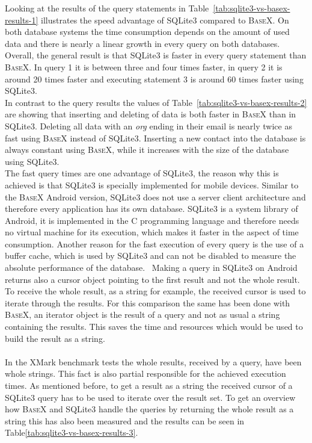 Looking at the results of the query statements in Table~\ref{tab:sqlite3-vs-basex-results-1} illustrates the speed advantage of SQLite3 compared to \textsc{BaseX}.
On both database systems the time consumption depends on the amount of used data and there is nearly a linear growth in every query on both databases.
Overall, the general result is that SQLite3 is faster in every query statement than \textsc{BaseX}.
In query 1 it is between three and four times faster, in query 2 it is around 20 times faster and executing statement 3 is around 60 times faster using SQLite3.\\
In contrast to the query results the values of Table~\ref{tab:sqlite3-vs-basex-results-2} are showing that inserting and deleting of data is both faster in \textsc{BaseX} than in SQLite3.
Deleting all data with an \textit{org} ending in their email is nearly twice as fast using \textsc{BaseX} instead of SQLite3.
Inserting a new contact into the database is always constant using \textsc{BaseX}, while it increases with the size of the database using SQLite3.\\
The fast query times are one advantage of SQLite3, the reason why this is achieved is that SQLite3 is specially implemented for mobile devices.
Similar to the \textsc{BaseX} Android version, SQLite3 does not use a server client architecture and therefore every application has its own database.\cite{wei2012android}
SQLite3 is a system library of Android, it is implemented in the C programming language and therefore needs no virtual machine for its execution, which makes it faster in the aspect of time consumption.
Another reason for the fast execution of every query is the use of a buffer cache, which is used by SQLite3 and can not be disabled to measure the absolute performance of the database.~\cite{kim2012androbench}
Making a query in SQLite3 on Android returns also a cursor object pointing to the first result and not the whole result. 
To receive the whole result, as a string for example, the received cursor is used to iterate through the results.
For this comparison the same has been done with \textsc{BaseX}, an iterator object is the result of a query and not as usual a string containing the results.
This saves the time and resources which would be used to build the result as a string.\\
\\
In the XMark benchmark tests the whole results, received by a query, have been whole strings.
This fact is also partial responsible for the achieved execution times.
As mentioned before, to get a result as a string the received cursor of a SQLite3 query has to be used to iterate over the result set.
To get an overview how \textsc{BaseX} and SQLite3 handle the queries by returning the whole result as a string this has also been measured and the results can be seen in Table\ref{tab:sqlite3-vs-basex-results-3}.

